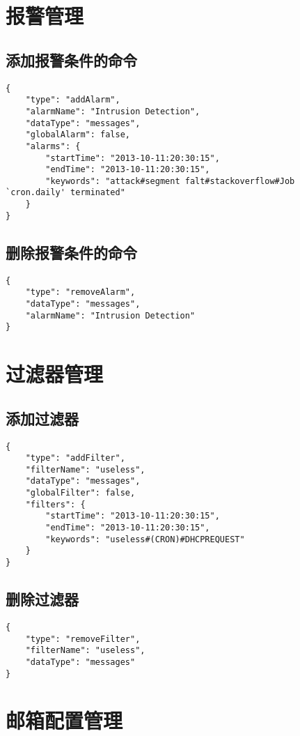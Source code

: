 \documentclass{article}
\begin{document}
\section{报警管理}
\subsection{添加报警条件的命令}
\begin{verbatim}
{
    "type": "addAlarm",
    "alarmName": "Intrusion Detection",
    "dataType": "messages",
    "globalAlarm": false,
    "alarms": {
        "startTime": "2013-10-11:20:30:15",
        "endTime": "2013-10-11:20:30:15",
        "keywords": "attack#segment falt#stackoverflow#Job `cron.daily' terminated"
    }
}
\end{verbatim}

\subsection{删除报警条件的命令}
\begin{verbatim}
{
    "type": "removeAlarm",
    "dataType": "messages",
    "alarmName": "Intrusion Detection"
}
\end{verbatim}

\section{过滤器管理}
\subsection{添加过滤器}
\begin{verbatim}
{
    "type": "addFilter",
    "filterName": "useless",
    "dataType": "messages",
    "globalFilter": false,
    "filters": {
        "startTime": "2013-10-11:20:30:15",
        "endTime": "2013-10-11:20:30:15",
        "keywords": "useless#(CRON)#DHCPREQUEST"
    }
}
\end{verbatim}
\subsection{删除过滤器}
\begin{verbatim}
{
    "type": "removeFilter",
    "filterName": "useless",
    "dataType": "messages"
}
\end{verbatim}

\section{邮箱配置管理}
\end{document}
